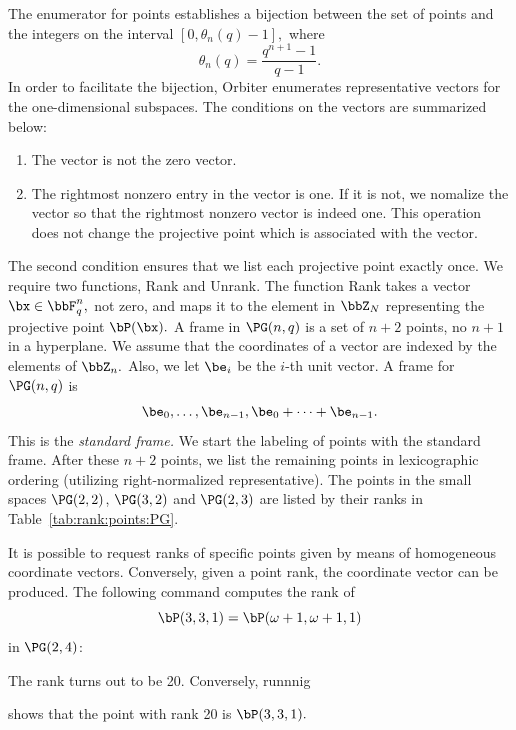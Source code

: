 The enumerator for points establishes a bijection between 
the set of points and the integers on the 
interval $[0,\theta_n(q)-1],$ 
where 
$$
\theta_n(q) = \frac{q^{n+1}-1}{q-1}.
$$
In order to facilitate the bijection, 
Orbiter enumerates representative vectors 
for the one-dimensional subspaces.
The conditions on the vectors are summarized below:
\begin{enumerate}
\item
The vector is not the zero vector.
\item
The rightmost nonzero entry in the vector is one. 
If it is not, we nomalize the vector 
so that the rightmost nonzero vector is indeed one. 
This operation does not change the projective 
point which is associated with the vector.
\end{enumerate}
The second condition ensures that we list 
each projective point exactly once.
We require two functions, 
{\sc Rank} and {\sc Unrank}. 
The function {\sc Rank} takes a vector 
$\bx \in \bbF_q^n,$ 
not zero, and maps it to the element in $\bbZ_N$ 
representing the projective point 
$\bP(\bx).$
A frame in $\PG(n,q)$ is a set of $n+2$ points, no $n+1$ in a hyperplane. 
We assume that the coordinates of a vector 
are indexed by the elements of $\bbZ_n.$ 
Also, we let $\be_i$ be the $i$-th unit vector. 
A frame for $\PG(n,q)$ is  
$$
\be_0,\ldots,\be_{n-1}, \be_0+\cdots+\be_{n-1}.
$$
This is the {\em standard frame.} 
We start the labeling of points with the  
standard frame. After these $n+2$ points, 
we list the remaining points 
in lexicographic ordering 
(utilizing right-normalized representative).
The points in the small spaces $\PG(2,2)$, $\PG(3,2)$ and $\PG(2,3)$ 
are listed by their ranks 
in Table~\ref{tab:rank:points:PG}.



\bigskip

It is possible to request ranks of specific points given by means of homogeneous coordinate vectors.
Conversely, given a point rank, 
the coordinate vector can be produced. 
The following command computes the rank of 
$$
\bP(3,3,1) = \bP(\omega+1,\omega+1,1)
$$
in $\PG(2,4)$:


The rank turns out to be 20.
Conversely, runnnig 


shows that the point with rank 20 is $\bP(3,3,1).$

\bigskip


